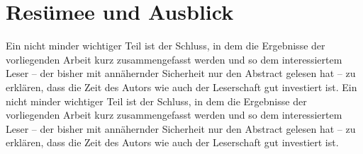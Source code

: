 \chapter{Resümee und Ausblick}

Ein nicht minder wichtiger Teil ist der Schluss, in dem die Ergebnisse der vorliegenden Arbeit kurz zusammengefasst werden und so dem interessiertem Leser -- der bisher mit annähernder Sicherheit nur den Abstract gelesen hat -- zu erklären, dass die Zeit des Autors wie auch der Leserschaft gut investiert ist.
Ein nicht minder wichtiger Teil ist der Schluss, in dem die Ergebnisse der vorliegenden Arbeit kurz zusammengefasst werden und so dem interessiertem Leser -- der bisher mit annähernder Sicherheit nur den Abstract gelesen hat -- zu erklären, dass die Zeit des Autors wie auch der Leserschaft gut investiert ist.

